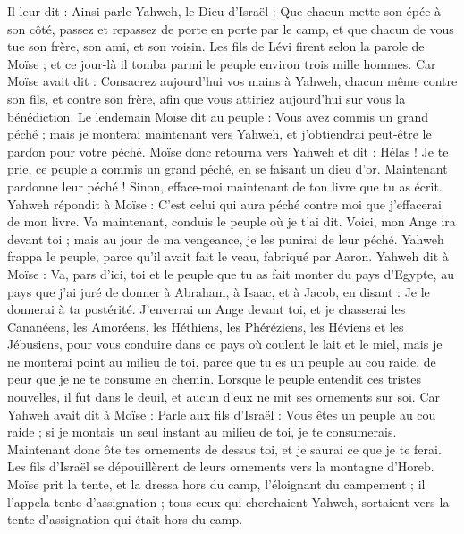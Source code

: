 \begin{multicols}{2}
Il leur dit : Ainsi parle Yahweh, le Dieu d'Israël : Que chacun mette son épée à son côté, passez et repassez de porte en porte par le camp, et que chacun de vous tue son frère, son ami, et son voisin.
Les fils de Lévi firent selon la parole de Moïse ; et ce jour-là il tomba parmi le peuple environ trois mille hommes.
Car Moïse avait dit : Consacrez aujourd'hui vos mains à Yahweh, chacun même contre son fils, et contre son frère, afin que vous attiriez aujourd'hui sur vous la bénédiction.
Le lendemain Moïse dit au peuple : Vous avez commis un grand péché ; mais je monterai maintenant vers Yahweh, et j’obtiendrai peut-être le pardon pour votre péché.
Moïse donc retourna vers Yahweh et dit : Hélas ! Je te prie, ce peuple a commis un grand péché, en se faisant un dieu d'or.
Maintenant pardonne leur péché ! Sinon, efface-moi maintenant de ton livre que tu as écrit.
Yahweh répondit à Moïse : C’est celui qui aura péché contre moi que j’effacerai de mon livre.
Va maintenant, conduis le peuple où je t’ai dit. Voici, mon Ange ira devant toi ; mais au jour de ma vengeance, je les punirai de leur péché.
Yahweh frappa le peuple, parce qu'il avait fait le veau, fabriqué par Aaron.
\VerseOne{}Yahweh dit à Moïse : Va, pars d'ici, toi et le peuple que tu as fait monter du pays d'Egypte, au pays que j'ai juré de donner à Abraham, à Isaac, et à Jacob, en disant : Je le donnerai à ta postérité.
J'enverrai un Ange devant toi, et je chasserai les Cananéens, les Amoréens, les Héthiens, les Phéréziens, les Héviens et les Jébusiens,
pour vous conduire dans ce pays où coulent le lait et le miel, mais je ne monterai point au milieu de toi, parce que tu es un peuple au cou raide, de peur que je ne te consume en chemin.
Lorsque le peuple entendit ces tristes nouvelles, il fut dans le deuil, et aucun d'eux ne mit ses ornements sur soi.
Car Yahweh avait dit à Moïse : Parle aux fils d'Israël : Vous êtes un peuple au cou raide ; si je montais un seul instant au milieu de toi, je te consumerais. Maintenant donc ôte tes ornements de dessus toi, et je saurai ce que je te ferai.
Les fils d'Israël se dépouillèrent de leurs ornements vers la montagne d'Horeb.
Moïse prit la tente, et la dressa hors du camp, l'éloignant du campement ; il l'appela tente d'assignation ; tous ceux qui cherchaient Yahweh, sortaient vers la tente d'assignation qui était hors du camp.

\end{multicols}
